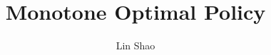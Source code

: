 \documentclass[12pt]{article}
\begin{document}
\title{Monotone Optimal Policy}
\author{Lin Shao}
\date{}
\maketitle
\end{document}
